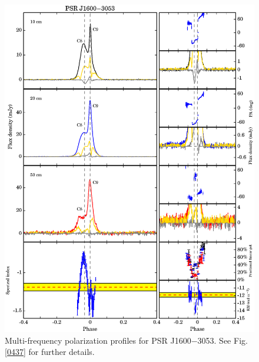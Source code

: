 \documentclass[useAMS,usenatbib]{mn2e}
\begin{document}
\begin{appendix}
\begin{figure}
\begin{center}
\includegraphics[width=6 in]{1600.ps}
\caption{Multi-frequency polarization profiles for PSR J1600$-$3053. 
See Fig. \ref{0437} for further details.}
\label{1600}
\end{center}
\end{figure}


\end{appendix}
\end{document}
